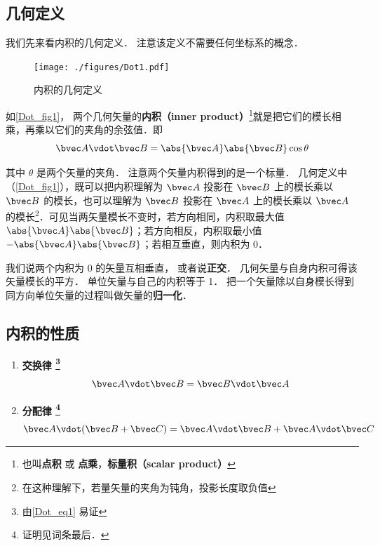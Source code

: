 

\subsection{几何定义}
我们先来看内积的几何定义． 注意该定义不需要任何坐标系的概念．
\begin{figure}[th]
\centering
\texttt{[image: ./figures/Dot1.pdf]}
\caption{内积的几何定义}\label{Dot_fig1}
\end{figure}

如\autoref{Dot_fig1}， 两个几何矢量的\textbf{内积（inner product）}\footnote{也叫\textbf{点积} 或 \textbf{点乘}，\textbf{标量积（scalar product）}}就是把它们的模长相乘，再乘以它们的夹角的余弦值．即
\begin{equation}\label{Dot_eq1}
\bvec A \vdot \bvec B = \abs{\bvec A} \abs{\bvec B} \cos\theta 
\end{equation}

其中 $\theta$ 是两个矢量的夹角． 注意两个矢量内积得到的是一个标量． 几何定义中（\autoref{Dot_fig1}），既可以把内积理解为 $\bvec A$ 投影在 $\bvec B$ 上的模长乘以 $\bvec B$ 的模长，也可以理解为 $\bvec B$ 投影在 $\bvec A$ 上的模长乘以 $\bvec A$ 的模长\footnote{在这种理解下，若量矢量的夹角为钝角，投影长度取负值}．可见当两矢量模长不变时，若方向相同，内积取最大值 $\abs{\bvec A}\abs{\bvec B}$；若方向相反，内积取最小值 $-\abs{\bvec A}\abs{\bvec B}$；若相互垂直，则内积为 0．

我们说两个内积为 0 的矢量互相垂直， 或者说\textbf{正交}． 几何矢量与自身内积可得该矢量模长的平方． 单位矢量与自己的内积等于 1． 把一个矢量除以自身模长得到同方向单位矢量的过程叫做矢量的\textbf{归一化}．

\subsection{内积的性质}

\begin{enumerate}
\item \textbf{交换律 \footnote{由\autoref{Dot_eq1} 易证}}
\begin{equation}\label{Dot_eq2}
\bvec A \vdot \bvec B = \bvec B \vdot \bvec A
\end{equation}

\item \textbf{分配律 \footnote{证明见词条最后．}}
\begin{equation}\label{Dot_eq3}
\bvec A \vdot (\bvec B + \bvec C) = \bvec A \vdot \bvec B + \bvec A \vdot \bvec C
\end{equation}
\end{enumerate}

